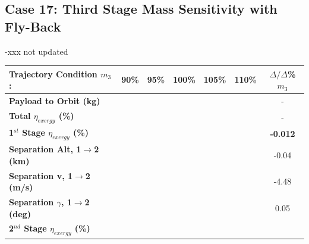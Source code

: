 \subsection{Case 17: Third Stage Mass Sensitivity with Fly-Back}
-xxx not updated
\begin{table}[ht]%
	\centering
	\begin{tabular}{l c c c c c c} 
		\hline \textbf{Trajectory Condition}   \qquad  $m_{3}$:
		&90\%
		&95\%
		&100\%
		&105\%
		&110\%
		& $\Delta/\Delta$\%$m_{3}$
		\\
		\hline \textbf{Payload to Orbit (kg)}
		& \textbf{\PayloadToOrbitmThreeNinety}
		& \textbf{\PayloadToOrbitmThreeNinetyFive}
		& \textbf{\PayloadToOrbitmThreeStandard}
		& \textbf{\PayloadToOrbitmThreeOneHundredFive}
		& \textbf{\PayloadToOrbitmThreeOneHundredTen}
		& -
		\\
		\textbf{Total $\eta_{exergy}$ (\%)}
		& \textbf{\totalExergyEffmThreeNinety}
		& \textbf{\totalExergyEffmThreeNinetyFive}
		& \textbf{\totalExergyEffmThreeStandard}
		& \textbf{\totalExergyEffmThreeOneHundredFive}
		& \textbf{\totalExergyEffmThreeOneHundredTen}
		& -
		\\
		\hline 
		\textbf{1$^{st}$ Stage $\eta_{exergy}$ (\%)}
		& \textbf{\firstExergyEffmThreeNinety}
		& \textbf{\firstExergyEffmThreeNinetyFive}
		& \textbf{\firstExergyEffmThreeStandard}
		& \textbf{\firstExergyEffmThreeOneHundredFive}
		& \textbf{\firstExergyEffmThreeOneHundredTen}
		& \textbf{-0.012}
		\\
		\textbf{Separation Alt, 1$\rightarrow$2 (km)}
		& \firstsecondSeparationAltmThreeNinety
		& \firstsecondSeparationAltmThreeNinetyFive
		& \firstsecondSeparationAltmThreeStandard
		& \firstsecondSeparationAltmThreeOneHundredFive
		& \firstsecondSeparationAltmThreeOneHundredTen
		&-0.04
		\\
		\textbf{Separation v, 1$\rightarrow$2 (m/s)}
		& \firstsecondSeparationvmThreeNinety
		& \firstsecondSeparationvmThreeNinetyFive
		& \firstsecondSeparationvmThreeStandard
		& \firstsecondSeparationvmThreeOneHundredFive
		& \firstsecondSeparationvmThreeOneHundredTen
		&-4.48
		\\
		\textbf{Separation $\gamma$, 1$\rightarrow$2 (deg)}
		& \firstsecondSeparationgammamThreeNinety
		& \firstsecondSeparationgammamThreeNinetyFive
		& \firstsecondSeparationgammamThreeStandard
		& \firstsecondSeparationgammamThreeOneHundredFive
		& \firstsecondSeparationgammamThreeOneHundredTen
		&0.05
		\\
		\hline 
		\textbf{2$^{nd}$ Stage $\eta_{exergy}$ (\%)}

\end{tabular}
\end{table}
